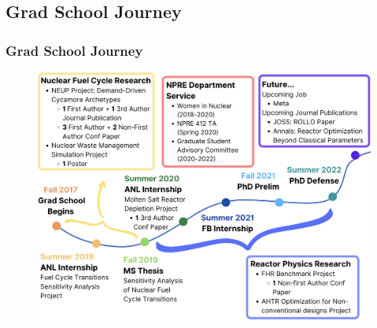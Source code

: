 \subsection*{Grad School Journey}
\begin{frame}
    \frametitle{Grad School Journey}
    \vspace{-0.2cm}
    \begin{figure}[]
        \includegraphics[width=0.9\linewidth]{figures/grad-school-journey.png} 
    \end{figure}
\end{frame}

